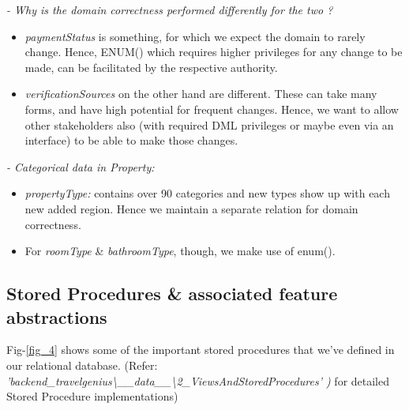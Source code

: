 \documentclass[conference]{IEEEtran}
\begin{document}
\begin{enumerate}
	        \vspace{1mm}
	
	\par
	        \textit{- Why is the domain correctness performed differently for the two ?}
	        
	        \begin{itemize}
    	            \item \textit{paymentStatus} is something, for which we expect the domain to rarely change.
    	Hence, ENUM() which requires higher privileges for any change to be made, can be facilitated by the respective authority.
    	            \item \textit{verificationSources} on the other hand are different. These can take many forms, and have high potential for frequent changes.
	Hence, we want to allow other stakeholders also (with required DML privileges or maybe even via an interface) to be able to make those changes.
	        \end{itemize}

		\vspace{1mm}

        \par
	        \textit{- Categorical data in Property:}
         
                \begin{itemize}
    	            \item \textit{propertyType:} contains over 90 categories and new types show up with each new added region. Hence we maintain a separate relation for domain correctness.
                        \item For \textit{roomType} \& \textit{bathroomType}, though, we make use of enum().
	        \end{itemize}
 
	\end{enumerate}

\subsection{\textbf{Stored Procedures \& associated feature abstractions}} \label{sec_storedProcedures_and_associatedFeatureAbstractions}
    Fig-\ref{fig_4} shows some of the important stored procedures that we’ve defined in our relational database.
(Refer:  \textit{'backend\_travelgenius{\textbackslash}\_\_data\_\_{\textbackslash}2\_ViewsAndStoredProcedures' \cite{4_Backend})} for detailed Stored Procedure implementations)
\end{document}
